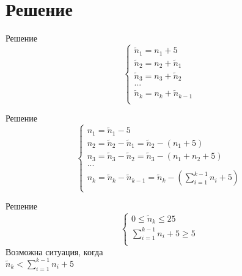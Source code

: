 \documentclass[12pt]{beamer}
\begin{document}
\section{Решение}

\begin{frame}{Решение}
\fontsize{15pt}{15pt}\selectfont
    \begin{equation}
        \begin{cases}
            \widetilde{n}_{1} = n_{1} + 5\\
            \widetilde{n}_{2} = n_{2} + \widetilde{n}_{1}\\
            \widetilde{n}_{3} = n_{3} + \widetilde{n}_{2}\\
            ...\\
            \widetilde{n}_{k} = n_{k} + \widetilde{n}_{k-1}\\
        \end{cases}
    \end{equation}
\end{frame}

\begin{frame}{Решение}
\fontsize{15pt}{15pt}\selectfont
    \begin{equation}
        \begin{cases}
            n_{1} = \widetilde{n}_{1} - 5\\
            n_{2} = \widetilde{n}_{2} - \widetilde{n}_{1} = \widetilde{n}_{2} - (n_{1} + 5)\\
            n_{3} = \widetilde{n}_{3} - \widetilde{n}_{2} = \widetilde{n}_{3} - (n_{1} + n_{2} + 5)\\
            ...\\
            n_{k} = \widetilde{n}_{k} - \widetilde{n}_{k-1} = \widetilde{n}_{k} - (\sum\limits_{i=1}^{k-1} n_{i} + 5)\\
        \end{cases}
    \end{equation}
\end{frame}

\begin{frame}{Решение}
\centering
\fontsize{15pt}{15pt}\selectfont
    \begin{equation}
        \begin{cases}
            0 \leq \widetilde{n}_{k} \leq 25\\
            \sum\limits_{i=1}^{k-1} n_{i} + 5 \geq 5\\
        \end{cases}
    \end{equation}
    Возможна ситуация, когда\\
    $\widetilde{n}_{k} < \sum\limits_{i=1}^{k-1} n_{i} + 5$
\end{frame}

\end{document}
